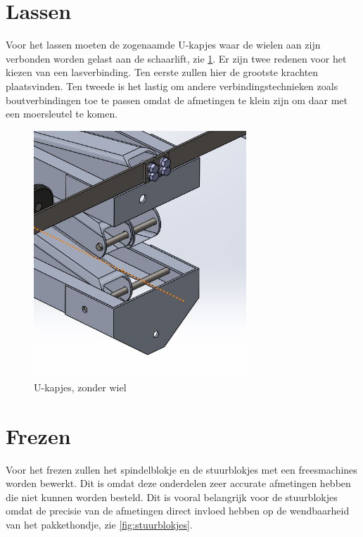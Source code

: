 \section{Lassen}
\label{se:Lassen}
Voor het lassen moeten de zogenaamde U-kapjes waar de wielen aan zijn verbonden worden gelast aan de schaarlift, zie \cref{fig:U-kapjes}. Er zijn twee redenen voor het kiezen van een lasverbinding. Ten eerste zullen hier de grootste krachten plaatsvinden. Ten tweede is het lastig om andere verbindingstechnieken zoals boutverbindingen toe te passen omdat de afmetingen te klein zijn om daar met een moersleutel te komen.

\begin{figure}[H]
    \includegraphics[width = 80mm]{04_vervaardigingsplan/U-kapjes.JPG}
    \caption{U-kapjes, zonder wiel}
    \label{fig:U-kapjes}
\end{figure}

\section{Frezen}
\label{se:Frezen}
Voor het frezen zullen het spindelblokje en de stuurblokjes met een freesmachines worden bewerkt. Dit is omdat deze onderdelen zeer accurate afmetingen hebben die niet kunnen worden besteld. Dit is vooral belangrijk voor de stuurblokjes omdat de precisie van de afmetingen direct invloed hebben op de wendbaarheid van het pakkethondje, zie \cref{fig:stuurblokjes}.


